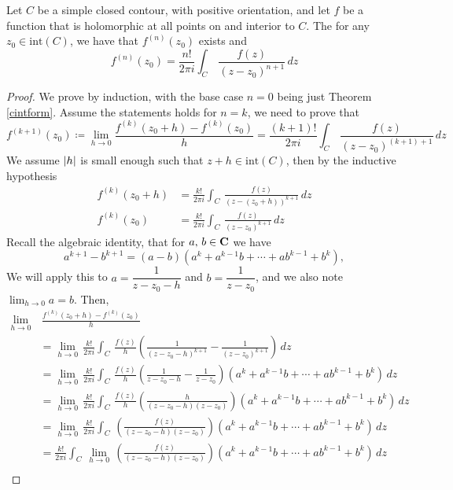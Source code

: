 \vspace*{1em}

\begin{theorem}\label{gencintform}
Let $C$ be a simple closed contour, with positive orientation, and let $f$ be a function that is holomorphic at all points on and interior to $C$. The for any $z_0 \in \mathrm{int}(C)$, we have that $f^{(n)}(z_0)$ exists and
\[f^{(n)}(z_0) = \frac{n!}{2\pi i}\int_C\,\frac{f(z)}{(z - z_0)^{n+1}}\,dz\]
\end{theorem}
\begin{proof}
We prove by induction, with the base case $n = 0$ being just Theorem \ref{cintform}. Assume the statements holds for $n = k$, we need to prove  that
\[f^{(k+1)}(z_0) \coloneqq \lim_{h \to 0}\frac{f^{(k)}(z_0 + h) - f^{(k)}(z_0)}{h} = \frac{(k+1)!}{2\pi i}\int_C\,\frac{f(z)}{(z - z_0)^{(k+1)+1}}\,dz\]
We assume $\left\lvert h\right\rvert$ is small enough such that $z + h \in \mathrm{int}(C)$, then by the inductive hypothesis
\begin{align*}
f^{(k)}(z_0 + h) &= \frac{k!}{2\pi i}\int_C\,\frac{f(z)}{(z - (z_0 + h))^{k+1}}\,dz\\[1em]
f^{(k)}(z_0) &= \frac{k!}{2\pi i}\int_C\,\frac{f(z)}{(z - z_0)^{k+1}}\,dz
\end{align*}
Recall the algebraic identity, that for $a,\,b \in \mathbf C$ we have
\[a^{k+1} - b^{k+1} = (a - b)(a^k + a^{k-1}b + \cdots + ab^{k-1} + b^k),\]
We will apply this to $a = \dfrac{1}{z - z_0 - h}$ and $b = \dfrac{1}{z - z_0}$, and we also note $\lim_{h \to 0}a = b$. Then,
\begin{align*}
\lim_{h \to 0}&\,\frac{f^{(k)}(z_0 + h) - f^{(k)}(z_0)}{h}\\[1em]
&= \lim_{h \to 0}\,\frac{k!}{2\pi i}\int_C\,\frac{f(z)}{h}\left(\frac{1}{(z - z_0 - h)^{k+1}} - \frac{1}{(z - z_0)^{k+1}}\right)\,dz\\[1em]
 &= \lim_{h \to 0}\,\frac{k!}{2\pi i}\int_C\,\frac{f(z)}{h}\left(\frac{1}{z - z_0 - h} - \frac{1}{z - z_0}\right)(a^k + a^{k-1}b + \cdots + ab^{k-1} + b^k)\,dz \\[1em]
 &= \lim_{h \to 0}\,\frac{k!}{2\pi i}\int_C\,\frac{f(z)}{h}\left(\frac{h}{(z - z_0 - h)(z - z_0)}\right)(a^k + a^{k-1}b + \cdots + ab^{k-1} + b^k)\,dz \\[1em]
 &= \lim_{h \to 0}\,\frac{k!}{2\pi i}\int_C\,\left(\frac{f(z)}{(z - z_0 - h)(z - z_0)}\right)(a^k + a^{k-1}b + \cdots + ab^{k-1} + b^k)\,dz \\[1em]
 &= \frac{k!}{2\pi i}\int_C\,\lim_{h \to 0}\,\left(\frac{f(z)}{(z - z_0 - h)(z - z_0)}\right)(a^k + a^{k-1}b + \cdots + ab^{k-1} + b^k)\,dz \\[1em]

\end{align*}
\end{proof}
